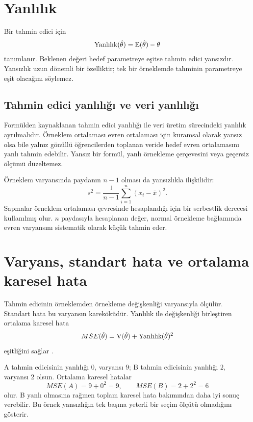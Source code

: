\section{Yanlılık}

Bir tahmin edici için
\[
\text{Yanlılık}(\hat\theta)
=\mathbb{E}(\hat\theta)-\theta
\]
tanımlanır. Beklenen değeri hedef parametreye eşitse tahmin edici yansızdır.
Yansızlık uzun dönemli bir özelliktir; tek bir örneklemde tahminin parametreye
eşit olacağını söylemez.

\subsection{Tahmin edici yanlılığı ve veri yanlılığı}

Formülden kaynaklanan tahmin edici yanlılığı ile veri üretim sürecindeki
yanlılık ayrılmalıdır. Örneklem ortalaması evren ortalaması için kuramsal
olarak yansız olsa bile yalnız gönüllü öğrencilerden toplanan veride hedef
evren ortalamasını yanlı tahmin edebilir. Yansız bir formül, yanlı örnekleme
çerçevesini veya geçersiz ölçümü düzeltemez.

Örneklem varyansında paydanın $n-1$ olması da yansızlıkla ilişkilidir:
\[
s^2=\frac{1}{n-1}\sum_{i=1}^n(x_i-\bar x)^2.
\]
Sapmalar örneklem ortalaması çevresinde hesaplandığı için bir serbestlik
derecesi kullanılmış olur. $n$ paydasıyla hesaplanan değer, normal örnekleme
bağlamında evren varyansını sistematik olarak küçük tahmin eder.

\section{Varyans, standart hata ve ortalama karesel hata}

Tahmin edicinin örneklemden örnekleme değişkenliği varyansıyla ölçülür.
Standart hata bu varyansın kareköküdür. Yanlılık ile değişkenliği birleştiren
ortalama karesel hata
\[
MSE(\hat\theta)=\operatorname{V}(\hat\theta)
+\text{Yanlılık}(\hat\theta)^2
\]
eşitliğini sağlar \cite{shao2003,wasserman2004}.

\begin{ornek}
A tahmin edicisinin yanlılığı 0, varyansı 9; B tahmin edicisinin yanlılığı 2,
varyansı 2 olsun. Ortalama karesel hatalar
\[
MSE(A)=9+0^2=9,
\qquad
MSE(B)=2+2^2=6
\]
olur. B yanlı olmasına rağmen toplam karesel hata bakımından daha iyi sonuç
verebilir. Bu örnek yansızlığın tek başına yeterli bir seçim ölçütü olmadığını
gösterir.
\end{ornek}

